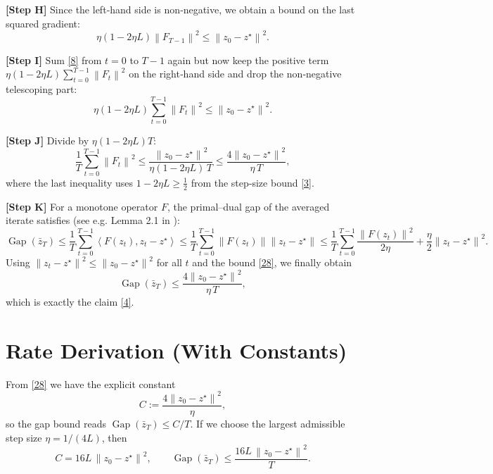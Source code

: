 \documentclass{article}
\newcommand{\norm}[1]{\left\lVert#1\right\rVert}
\newcommand{\inner}[2]{\left\langle #1,#2 \right\rangle}
\begin{document}
\textbf{[Step H]} Since the left‑hand side is non‑negative, we obtain a bound on the last squared gradient:
\[
\eta(1-2\eta L)\norm{F_{T-1}}^{2}
\le \norm{z_{0}-z^{\star}}^{2}.
\tag{26}
\]

\textbf{[Step I]} Sum \eqref{8} from $t=0$ to $T-1$ again but now keep the positive term $ \eta(1-2\eta L)\sum_{t=0}^{T-1}\norm{F_{t}}^{2}$ on the right‑hand side and drop the non‑negative telescoping part:
\[
\eta(1-2\eta L)\sum_{t=0}^{T-1}\norm{F_{t}}^{2}
\le \norm{z_{0}-z^{\star}}^{2}.
\tag{27}
\]

\textbf{[Step J]} Divide by $\eta(1-2\eta L)T$:
\[
\frac{1}{T}\sum_{t=0}^{T-1}\norm{F_{t}}^{2}
\le
\frac{\norm{z_{0}-z^{\star}}^{2}}{\eta(1-2\eta L)\,T}
\le
\frac{4\norm{z_{0}-z^{\star}}^{2}}{\eta\,T},
\tag{28}
\]
where the last inequality uses $1-2\eta L\ge \tfrac12$ from the step‑size bound \eqref{3}.

\textbf{[Step K]} For a monotone operator $F$, the primal–dual gap of the averaged iterate satisfies (see e.g. Lemma 2.1 in \cite{nemirovski2004prox}):
\[
\operatorname{Gap}(\bar z_{T})
\le \frac{1}{T}\sum_{t=0}^{T-1}\inner{F(z_{t})}{z_{t}-z^{\star}}
\le \frac{1}{T}\sum_{t=0}^{T-1}\norm{F(z_{t})}\norm{z_{t}-z^{\star}}
\le \frac{1}{T}\sum_{t=0}^{T-1}\frac{\norm{F(z_{t})}^{2}}{2\eta}
+\frac{\eta}{2}\norm{z_{t}-z^{\star}}^{2}.
\]
Using $\norm{z_{t}-z^{\star}}^{2}\le \norm{z_{0}-z^{\star}}^{2}$ for all $t$ and the bound \eqref{28}, we finally obtain
\[
\operatorname{Gap}(\bar z_{T})
\le \frac{4\norm{z_{0}-z^{\star}}^{2}}{\eta\,T},
\]
which is exactly the claim \eqref{4}. \hfill\qedsymbol

\section*{Rate Derivation (With Constants)}
From \eqref{28} we have the explicit constant
\[
C:=\frac{4\norm{z_{0}-z^{\star}}^{2}}{\eta},
\]
so the gap bound reads $\operatorname{Gap}(\bar z_{T})\le C/T$.  
If we choose the largest admissible step size $\eta=1/(4L)$, then
\[
C = 16L\,\norm{z_{0}-z^{\star}}^{2},
\qquad
\operatorname{Gap}(\bar z_{T})\le \frac{16L\,\norm{z_{0}-z^{\star}}^{2}}{T}.
\]

\end{document}
